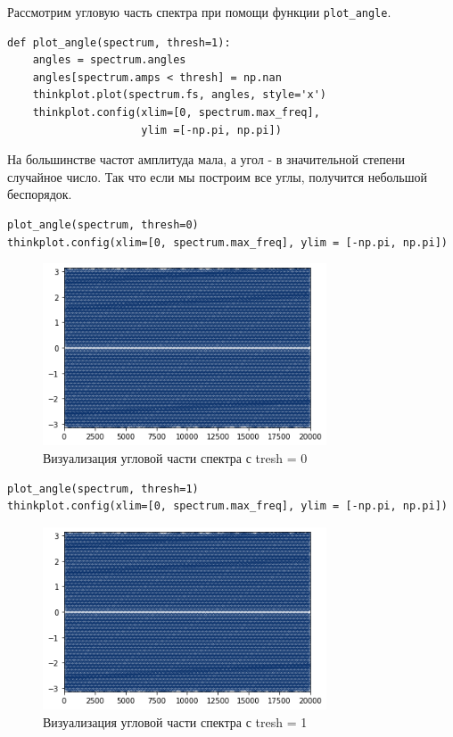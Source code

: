 \documentclass[a4paper,12pt]{report}
\begin{document}
Рассмотрим угловую часть спектра при помощи функции \texttt{plot\_angle}.

\begin{lstlisting}[caption=Функция \texttt{plot\_angle}]
def plot_angle(spectrum, thresh=1):
    angles = spectrum.angles
    angles[spectrum.amps < thresh] = np.nan
    thinkplot.plot(spectrum.fs, angles, style='x')
    thinkplot.config(xlim=[0, spectrum.max_freq],
                     ylim =[-np.pi, np.pi])
\end{lstlisting}

На большинстве частот амплитуда мала, а угол - в значительной степени случайное число. Так что если мы построим все углы, получится небольшой беспорядок.

\begin{lstlisting}[caption=Визуализация угловой части спектра с tresh = 0]
plot_angle(spectrum, thresh=0)
thinkplot.config(xlim=[0, spectrum.max_freq], ylim = [-np.pi, np.pi])
\end{lstlisting}

\begin{figure}[H]
        \centering
        \includegraphics[width=0.75\textwidth]{lab6_fig3_3.png}
        \caption{Визуализация угловой части спектра с tresh = 0}
        \label{fig:lab6_fig3_3}
\end{figure}

\begin{lstlisting}[caption=Визуализация угловой части спектра с tresh = 1]
plot_angle(spectrum, thresh=1)
thinkplot.config(xlim=[0, spectrum.max_freq], ylim = [-np.pi, np.pi])
\end{lstlisting}

\begin{figure}[H]
        \centering
        \includegraphics[width=0.75\textwidth]{lab6_fig3_4.png}
        \caption{Визуализация угловой части спектра с tresh = 1}
        \label{fig:lab6_fig3_4}
\end{figure}
\end{document}
